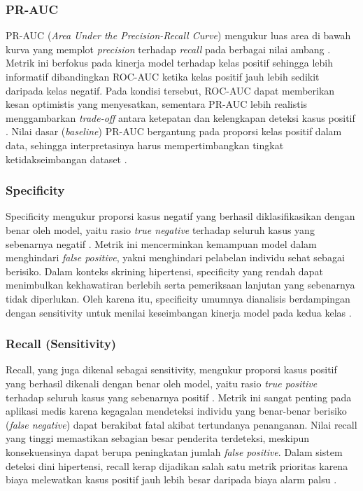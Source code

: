 \subsubsection{PR-AUC}
PR-AUC (\emph{Area Under the Precision-Recall Curve}) mengukur luas area di bawah kurva yang memplot \emph{precision} terhadap \emph{recall} pada berbagai nilai ambang \autocite{Saito2015Precision}. Metrik ini berfokus pada kinerja model terhadap kelas positif sehingga lebih informatif dibandingkan ROC-AUC ketika kelas positif jauh lebih sedikit daripada kelas negatif. Pada kondisi tersebut, ROC-AUC dapat memberikan kesan optimistis yang menyesatkan, sementara PR-AUC lebih realistis menggambarkan \emph{trade-off} antara ketepatan dan kelengkapan deteksi kasus positif \autocite{Saito2015Precision}. Nilai dasar (\emph{baseline}) PR-AUC bergantung pada proporsi kelas positif dalam data, sehingga interpretasinya harus mempertimbangkan tingkat ketidakseimbangan dataset \autocite{Saito2015Precision}.

\subsubsection{Specificity}
Specificity mengukur proporsi kasus negatif yang berhasil diklasifikasikan dengan benar oleh model, yaitu rasio \emph{true negative} terhadap seluruh kasus yang sebenarnya negatif \autocite{Sokolova2009Systematic}. Metrik ini mencerminkan kemampuan model dalam menghindari \emph{false positive}, yakni menghindari pelabelan individu sehat sebagai berisiko. Dalam konteks skrining hipertensi, specificity yang rendah dapat menimbulkan kekhawatiran berlebih serta pemeriksaan lanjutan yang sebenarnya tidak diperlukan. Oleh karena itu, specificity umumnya dianalisis berdampingan dengan sensitivity untuk menilai keseimbangan kinerja model pada kedua kelas \autocite{Sokolova2009Systematic}.

\subsubsection{Recall (Sensitivity)}
Recall, yang juga dikenal sebagai sensitivity, mengukur proporsi kasus positif yang berhasil dikenali dengan benar oleh model, yaitu rasio \emph{true positive} terhadap seluruh kasus yang sebenarnya positif \autocite{Sokolova2009Systematic}. Metrik ini sangat penting pada aplikasi medis karena kegagalan mendeteksi individu yang benar-benar berisiko (\emph{false negative}) dapat berakibat fatal akibat tertundanya penanganan. Nilai recall yang tinggi memastikan sebagian besar penderita terdeteksi, meskipun konsekuensinya dapat berupa peningkatan jumlah \emph{false positive}. Dalam sistem deteksi dini hipertensi, recall kerap dijadikan salah satu metrik prioritas karena biaya melewatkan kasus positif jauh lebih besar daripada biaya alarm palsu \autocite{Sokolova2009Systematic}.

